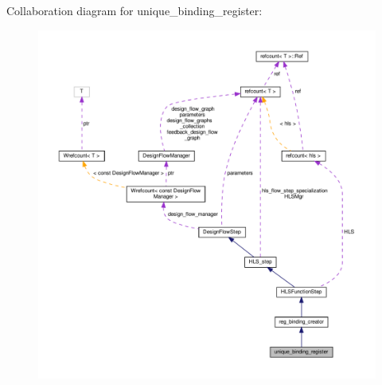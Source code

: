 Collaboration diagram for unique\+\_\+binding\+\_\+register\+:
\nopagebreak
\begin{figure}[H]
\begin{center}
\leavevmode
\includegraphics[width=350pt]{d7/d90/classunique__binding__register__coll__graph}
\end{center}
\end{figure}
